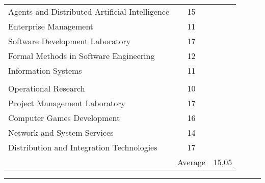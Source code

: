\documentclass[a4paper,10pt]{article} %
\begin{document}
\begin{center}
\begin{tabular}{lcc}
Agents and Distributed Artificial Intelligence & 15\\
Enterprise Management & 11\\
Software Development Laboratory & 17\\
Formal Methods in Software Engineering & 12\\
Information Systems & 11\\ \\
Operational Research & 10\\
Project Management Laboratory & 17\\
Computer Games Development & 16\\
Network and System Services & 14\\
Distribution and Integration Technologies & 17\\														
& Average & 15,05 \\\cline{2-3}
\end{tabular}
\end{center}
\bigskip
\hrule
\bigskip

\end{document}

